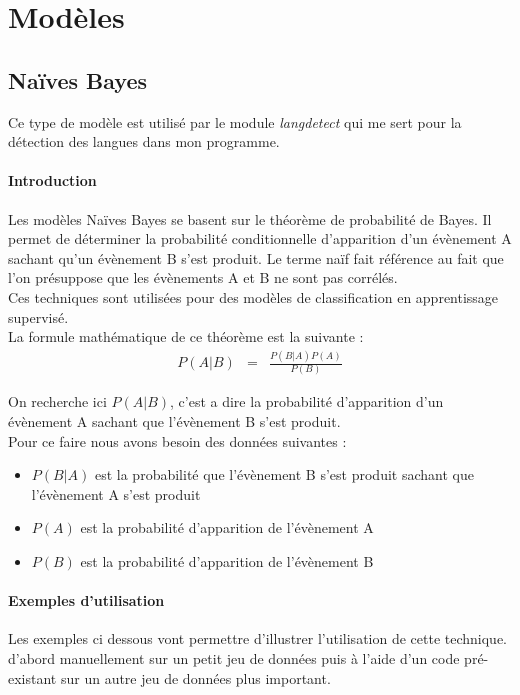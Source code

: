 \documentclass[a4paper,12pt]{article}
\begin{document}
	\section{Modèles}	
		\subsection{Naïves Bayes}
			Ce type de modèle est utilisé par le module \emph{langdetect} qui me sert pour la détection des langues dans mon programme.
			
			\paragraph{Introduction}
				Les modèles Naïves Bayes se basent sur le théorème de probabilité de Bayes. Il permet de déterminer la probabilité conditionnelle d'apparition d'un évènement A sachant qu'un évènement B s'est produit. Le terme naïf fait référence au fait que l'on présuppose que les évènements A et B ne sont pas corrélés.\\
				Ces techniques sont utilisées pour des modèles de classification en apprentissage supervisé.\\
				
				La formule mathématique de ce théorème est la suivante :
				\begin{eqnarray}\label{NBeq}
					P(A|B) &=& \frac{P(B|A)P(A)}{P(B)}
				\end{eqnarray}
				
			On recherche ici $P(A|B)$, c'est a dire la probabilité d'apparition d'un évènement A sachant que l'évènement B s'est produit. \\ 
			
			Pour ce faire nous avons besoin des données suivantes :
			\begin{itemize}
				\item $P(B|A)$ est la probabilité que l'évènement B s'est produit sachant que l'évènement A s'est produit
				\item $P(A)$ est la probabilité d'apparition de l'évènement A
				\item $P(B)$ est la probabilité d'apparition de l'évènement B
			\end{itemize}
			
			\paragraph{Exemples d'utilisation}
				Les exemples ci dessous vont permettre d'illustrer l'utilisation de cette technique. d'abord manuellement sur un petit jeu de données puis à l'aide d'un code pré-existant sur un autre jeu de données plus important.
				
\end{document}
